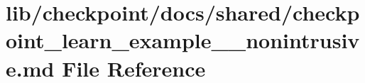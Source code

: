 \hypertarget{checkpoint__learn__example__1__nonintrusive_8md}{}\section{lib/checkpoint/docs/shared/checkpoint\+\_\+learn\+\_\+example\+\_\+\_\+nonintrusive.md File Reference}
\label{checkpoint__learn__example__1__nonintrusive_8md}
